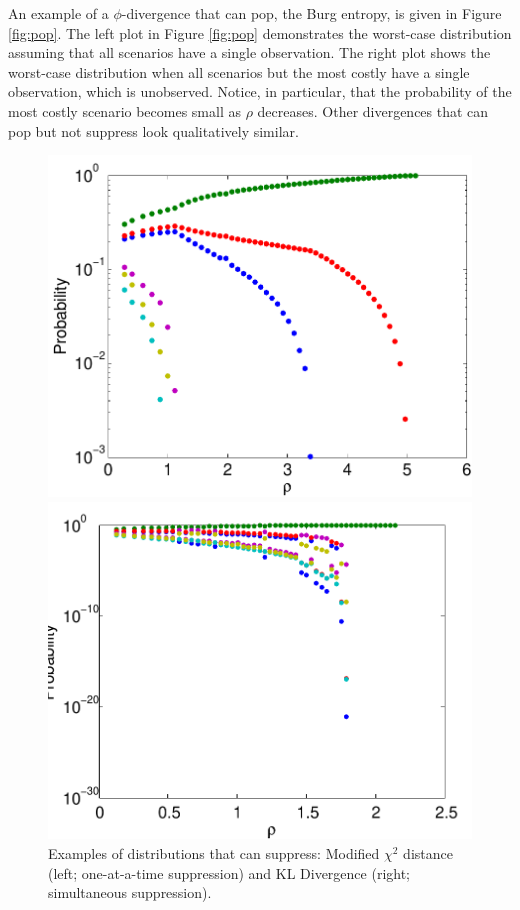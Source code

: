 \documentclass[ijoc,letterpaper]{informs3} %
\begin{document}
An example of a $\phi$-divergence that can pop, the Burg entropy, is given in Figure \ref{fig:pop}.
The left plot in Figure \ref{fig:pop} demonstrates the worst-case distribution assuming that all scenarios have a single observation.
The right plot shows the worst-case distribution when all scenarios but the most costly have a single observation, which is unobserved.
Notice, in particular, that the probability of the most costly scenario becomes small as $\rho$ decreases.
Other divergences that can pop but not suppress look qualitatively similar.

\begin{figure}
	\FIGURE
	{%
		\includegraphics*[width=.45\textwidth]{images/mchi2}%
		\includegraphics*[width=.45\textwidth]{images/kl}%
	}
	{
		Examples of distributions that can suppress: Modified $\chi^2$ distance (left; one-at-a-time suppression) and KL Divergence (right; simultaneous suppression).
		\label{fig:suppress}
	}
	{}
\end{figure}
\end{document}
